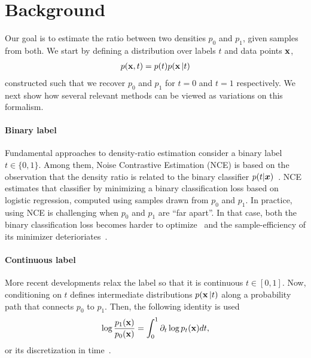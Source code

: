 
\section{Background}
\label{sec:background}

Our goal is to estimate the ratio between two densities $p_0$ and $p_1$, given samples from both. We start by defining a distribution over labels $t$ and data points $\operatorname{\mathbf{x}}$,
\begin{align}
    \label{eq:joint_model_two_variables}
    p(\operatorname{\mathbf{x}}, t) = p(t) p(\operatorname{\mathbf{x}} | t)
\end{align}
constructed such that we recover $p_{0}$ and $p_{1}$ for $t=0$ and $t=1$ respectively. We next show how several relevant methods can be viewed as variations on this formalism. 

\paragraph{Binary label}
Fundamental approaches to density-ratio estimation consider
a binary label $t \in \{0, 1\}$. Among them, Noise Contrastive Estimation (NCE) is based on the observation that the density ratio is related to the binary classifier $p(t | {\bm{x}})$~\citep[Eq. 5]{gutmann2012nce}. NCE estimates that classifier by minimizing a binary classification loss based on logistic regression, computed using samples drawn from $p_0$ and $p_1$. In practice, using NCE is challenging when $p_0$ and $p_1$ are ``far apart''. In that case, both the binary classification loss becomes harder to optimize~\citep{liu2022nceoptim} and the sample-efficiency of its minimizer deterioriates~\citep{gutmann2012nce,lee2023ncevariance,Chehab2023optimizing,Chehab2023provable}. 

\paragraph{Continuous label}
More recent developments relax the label so that it is continuous $t \in [0, 1]$. Now, conditioning on $t$ defines intermediate distributions $p(\operatorname{\mathbf{x}} | t)$ along a probability path that connects $p_0$ to $p_1$. Then, the following identity is used~\citep{choi2022densityratio}
\begin{align}
    \label{eq:main_identity}
    \log \frac{p_1(\operatorname{\mathbf{x}})}{p_0(\operatorname{\mathbf{x}})}
    =
    \int_0^1 \partial_t \log p_t(\operatorname{\mathbf{x}}) dt,
\end{align}
or its discretization in time~\citep{Rhodes2020}. 


